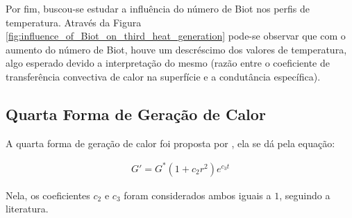 Por fim, buscou-se estudar a influência do número de Biot nos perfis de temperatura. Através da Figura \ref{fig:influence_of_Biot_on_third_heat_generation} pode-se observar que com o aumento do número de Biot, houve um descréscimo dos valores de temperatura, algo esperado devido a interpretação do mesmo (razão entre o coeficiente de transferência convectiva de calor na superfície e a condutância específica).

\subsection{Quarta Forma de Geração de Calor}

A quarta forma de geração de calor foi proposta por \citet{soares2017}, ela se dá pela equação:

\begin{gather}
    G ' = G ^* (1 + c_2 r ^2) e ^{c_3 t}
    \label{eq:fourth_form_of_heat}
\end{gather}

Nela, os coeficientes \(c_2\) e \(c_3\) foram considerados ambos iguais a \(1\), seguindo a literatura.

